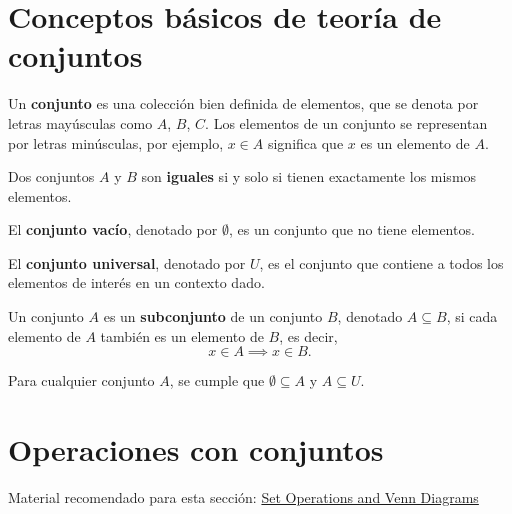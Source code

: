 \documentclass[a4,11pt]{aleph-notas}
\begin{document}
\encabezado

\section{Conceptos básicos de teoría de conjuntos}

\begin{defi}[Conjunto]
    Un \textbf{conjunto} es una colección bien definida de elementos, que se denota por letras mayúsculas como $A$, $B$, $C$. Los elementos de un conjunto se representan por letras minúsculas, por ejemplo, $x \in A$ significa que $x$ es un elemento de $A$.
\end{defi}

\begin{defi}
    Dos conjuntos $A$ y $B$ son \textbf{iguales} si y solo si tienen exactamente los mismos elementos.
\end{defi}


\begin{defi}
    El \textbf{conjunto vacío}, denotado por $\emptyset$, es un conjunto que no tiene elementos.
\end{defi}

\begin{defi}
    El \textbf{conjunto universal}, denotado por $U$, es el conjunto que contiene a todos los elementos de interés en un contexto dado.
\end{defi}

\begin{defi}[Subconjunto]
    Un conjunto $A$ es un \textbf{subconjunto} de un conjunto $B$, denotado $A \subseteq B$, si cada elemento de $A$ también es un elemento de $B$, es decir,
    \[
        x \in A \implies x \in B.
    \]
\end{defi}

\begin{teo}
    Para cualquier conjunto $A$, se cumple que $\emptyset \subseteq A$ y $A \subseteq U$.
\end{teo}

\section{Operaciones con conjuntos}

\begin{advertencia}
    Material recomendado para esta sección: \href{https://math24.net/set-operations-venn-diagrams.html}{Set Operations and Venn Diagrams}
\end{advertencia}
\end{document}
